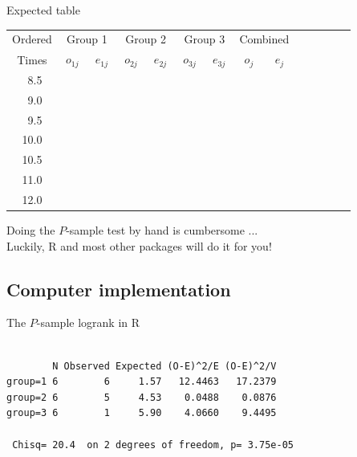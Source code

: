 \documentclass[envcountsect, 10pt, portrait, palatino]{beamer}
\begin{document}
\begin{frame}{Expected table}
\small
\begin{center}
\begin{tabular}{cccccccccccccc}
\hline
Ordered  & \multicolumn{2}{c}{Group 1}& \multicolumn{2}{c}{Group 2} &  \multicolumn{2}{c}{Group 3} &\multicolumn{2}{c}{Combined}  \\
\cline{2-3} \cline{4-5} \cline{6-7}
Times & $~o_{1j}~$ & $~e_{1j}~$  & $~o_{2j}~$ & $~e_{2j}~$  &
$~o_{3j}~$ & $~e_{3j}~$  & $~o_{j}~$ & $~e_{j}~$ &\\ \hline
~8.5   &  \\
~9.0     & \\
~9.5   & \\
10.0    & \\
10.5  & \\
11.0    & \\
12.0    & \\ \hline
\end{tabular}
\end{center}

Doing the $P$-sample test by hand is cumbersome ...
\\[2ex]
Luckily, R and most other packages will do it for you!
\end{frame}

\subsection{Computer implementation}
\begin{frame}[fragile]{The $P$-sample logrank in R}

\begin{verbatim}

        N Observed Expected (O-E)^2/E (O-E)^2/V
group=1 6        6     1.57   12.4463   17.2379
group=2 6        5     4.53    0.0488    0.0876
group=3 6        1     5.90    4.0660    9.4495

 Chisq= 20.4  on 2 degrees of freedom, p= 3.75e-05
\end{verbatim}
\end{frame} 
\end{document}
